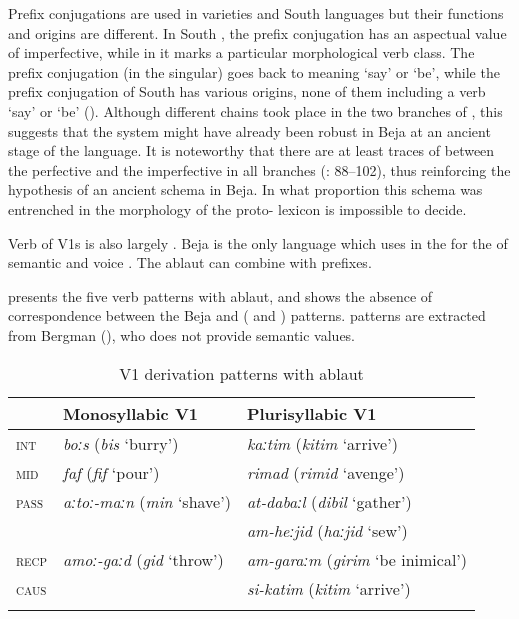 \documentclass[output=paper]{langsci/langscibook}
\begin{document}
Prefix conjugations are used in  varieties and South  languages but their functions and origins are different. In South , the prefix conjugation has an aspectual value of imperfective, while in  it marks a particular morphological verb class. The  prefix conjugation (in the singular) goes back to  meaning ‘say’ or ‘be’, while the prefix conjugation of South  has various origins, none of them including a verb ‘say’ or ‘be’ (\citealt{Cohen1984}). Although different  chains took place in the two branches of , this suggests that the  system might have already been robust in Beja at an ancient stage of the language. It is noteworthy that there are at least traces of  between the perfective and the imperfective in all  branches (\citealt{Cohen1984}: 88--102), thus reinforcing the hypothesis of an ancient  schema in Beja. In what proportion this schema was entrenched in the morphology of the proto- lexicon is impossible to decide.

Verb  of V1s is also largely . Beja is the only  language which uses  in the  for the  of semantic and voice . The ablaut can combine with prefixes. 

 presents the five verb  patterns with ablaut, and  shows the absence of correspondence between the Beja and  ( and ) patterns.  patterns are extracted from Bergman (\citeyear[32--34]{Bergman2002}), who does not provide semantic values.

\begin{table}
\begin{tabular}{lll}\lsptoprule 
& Monosyllabic V1 &  Plurisyllabic V1\\\midrule
\textsc{int} & \textit{boːs} (\textit{bis} ‘burry’) & \textit{kaːtim} (\textit{kitim} ‘arrive’)\\
\textsc{mid} & \textit{faf} (\textit{fif} ‘pour’) & \textit{rimad} (\textit{rimid} ‘avenge’)\\
\textsc{pass} & \textit{aːtoː-maːn} (\textit{min} ‘shave’) & \textit{at-dabaːl} (\textit{dibil} ‘gather’)\\
&  & \textit{am-heːjid} (\textit{haːjid} ‘sew’)\\
\textsc{recp} & \textit{amoː-gaːd} (\textit{gid} ‘throw’) & \textit{am-garaːm} (\textit{girim} ‘be inimical’)\\
\textsc{caus} &  & \textit{si-katim} (\textit{kitim} ‘arrive’)\\
\lspbottomrule
\end{tabular} 
\caption{V1 derivation patterns with ablaut}
\label{tab:V1}
\end{table}
\end{document}
